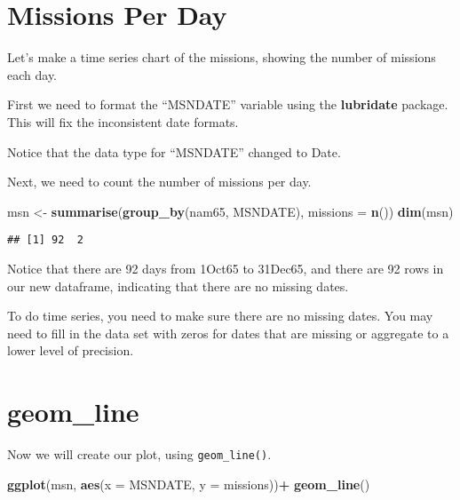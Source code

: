 \documentclass[oneside]{memoir}
\newenvironment{Shaded}{\begin{snugshade}}{\end{snugshade}}
\newcommand{\KeywordTok}[1]{\textcolor[rgb]{0.13,0.29,0.53}{\textbf{#1}}}
\newcommand{\DataTypeTok}[1]{\textcolor[rgb]{0.13,0.29,0.53}{#1}}
\newcommand{\StringTok}[1]{\textcolor[rgb]{0.31,0.60,0.02}{#1}}
\newcommand{\OperatorTok}[1]{\textcolor[rgb]{0.81,0.36,0.00}{\textbf{#1}}}
\newcommand{\NormalTok}[1]{#1}
\theoremstyle{definition}
\theoremstyle{definition}
\theoremstyle{definition}
\theoremstyle{remark}
\begin{document}
\section{Missions Per Day}\label{missions-per-day}

Let's make a time series chart of the missions, showing the number of
missions each day.

First we need to format the ``MSNDATE'' variable using the
\textbf{lubridate} package. This will fix the inconsistent date formats.

\begin{Shaded}
\end{Shaded}

Notice that the data type for ``MSNDATE'' changed to Date.

Next, we need to count the number of missions per day.

\begin{Shaded}
\begin{Highlighting}[]
\NormalTok{msn <-}\StringTok{ }\KeywordTok{summarise}\NormalTok{(}\KeywordTok{group_by}\NormalTok{(nam65, MSNDATE), }\DataTypeTok{missions =} \KeywordTok{n}\NormalTok{())}
\KeywordTok{dim}\NormalTok{(msn)}
\end{Highlighting}
\end{Shaded}

\begin{verbatim}
## [1] 92  2
\end{verbatim}

Notice that there are 92 days from 1Oct65 to 31Dec65, and there are 92
rows in our new dataframe, indicating that there are no missing dates.

To do time series, you need to make sure there are no missing dates. You
may need to fill in the data set with zeros for dates that are missing
or aggregate to a lower level of precision.

\section{geom\_line}\label{geom_line}

Now we will create our plot, using \texttt{geom\_line()}.

\begin{Shaded}
\begin{Highlighting}[]
\KeywordTok{ggplot}\NormalTok{(msn, }\KeywordTok{aes}\NormalTok{(}\DataTypeTok{x =}\NormalTok{ MSNDATE, }\DataTypeTok{y =}\NormalTok{ missions))}\OperatorTok{+}
\StringTok{  }\KeywordTok{geom_line}\NormalTok{()}
\end{Highlighting}
\end{Shaded}
\end{document}
